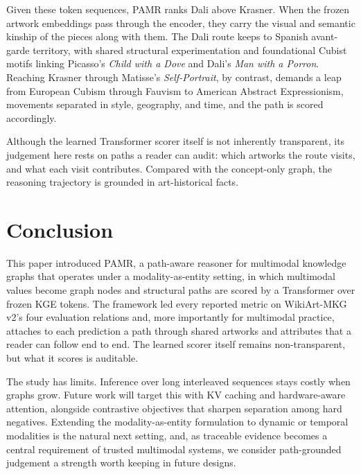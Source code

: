 \documentclass[runningheads]{llncs}
\begin{document}
Given these token sequences, PAMR ranks Dali above Krasner. When the frozen artwork embeddings pass through the encoder, they carry the visual and semantic kinship of the pieces along with them. The Dali route keeps to Spanish avant-garde territory, with shared structural experimentation and foundational Cubist motifs linking Picasso's \textit{Child with a Dove} and Dali's \textit{Man with a Porron}. Reaching Krasner through Matisse's \textit{Self-Portrait}, by contrast, demands a leap from European Cubism through Fauvism to American Abstract Expressionism, movements separated in style, geography, and time, and the path is scored accordingly.

Although the learned Transformer scorer itself is not inherently transparent, its judgement here rests on paths a reader can audit: which artworks the route visits, and what each visit contributes. Compared with the concept-only graph, the reasoning trajectory is grounded in art-historical facts.

\section{Conclusion}
\label{sec:conclusion}

This paper introduced PAMR, a path-aware reasoner for multimodal knowledge graphs that operates under a modality-as-entity setting, in which multimodal values become graph nodes and structural paths are scored by a Transformer over frozen KGE tokens. The framework led every reported metric on WikiArt-MKG v2's four evaluation relations and, more importantly for multimodal practice, attaches to each prediction a path through shared artworks and attributes that a reader can follow end to end. The learned scorer itself remains non-transparent, but what it scores is auditable.

The study has limits. Inference over long interleaved sequences stays
costly when graphs grow. Future work will target this with KV caching
and hardware-aware attention, alongside contrastive objectives that
sharpen separation among hard negatives. Extending the modality-as-entity
formulation to dynamic or temporal modalities is the natural next
setting, and, as traceable evidence becomes a central requirement of
trusted multimodal systems, we consider path-grounded judgement a
strength worth keeping in future designs.
\end{document}
